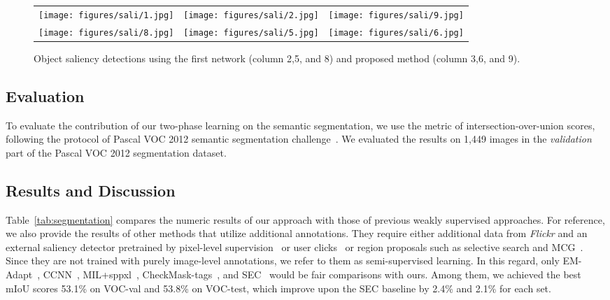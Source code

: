 \documentclass[10pt,twocolumn,letterpaper]{article}
\newcommand{\tabfref}[1]{Table~\ref{#1}}
\begin{document}
\begin{figure*}
\begin{center}
\def\arraystretch{0.5}
\begin{tabular}{@{}c@{\hskip 0.01\linewidth}c@{\hskip 0.01\linewidth}c}
\texttt{[image: figures/sali/1.jpg]} &
\texttt{[image: figures/sali/2.jpg]} &
\texttt{[image: figures/sali/9.jpg]} \\
\texttt{[image: figures/sali/8.jpg]} &
\texttt{[image: figures/sali/5.jpg]} &
\texttt{[image: figures/sali/6.jpg]} \\
\end{tabular}
\end{center}
\vspace{-0.1in}
\caption{Object saliency detections using the first network (column 2,5, and 8) and proposed method (column 3,6, and 9).}
\label{fig:saliency}
\end{figure*}

\subsection{Evaluation}
To evaluate the contribution of our two-phase learning on the semantic segmentation, we use the metric of intersection-over-union scores, following the protocol of Pascal VOC 2012 semantic segmentation challenge~\cite{Everingham10voc}. We evaluated the results on 1,449 images in the \textit{validation} part of the Pascal VOC 2012 segmentation dataset.

\subsection{Results and Discussion}
\tabfref{tab:segmentation} compares the numeric results of our approach with those of previous weakly supervised approaches. For reference, we also provide the results of other methods that utilize additional annotations. They require either additional data from \textit{Flickr} and an external saliency detector pretrained by pixel-level supervision~\cite{Wei15stc} or user clicks~\cite{SalehASPGA16builtin} or region proposals such as selective search and MCG~\cite{Pinheiro2015CVPR}. Since they are not trained with purely image-level annotations, we refer to them as semi-supervised learning. In this regard, only EM-Adapt~\cite{Papandreou_2015_ICCV}, CCNN~\cite{pathakICCV15ccnn}, MIL+sppxl~\cite{Pinheiro2015CVPR}, CheckMask-tags~\cite{SalehASPGA16builtin}, and SEC~\cite{kolesnikov2016seed} would be fair comparisons with ours. %
Among them, we achieved the best mIoU scores 53.1\% on VOC-val and 53.8\% on VOC-test, which improve upon the SEC baseline by 2.4\% and 2.1\% for each set.
\end{document}
